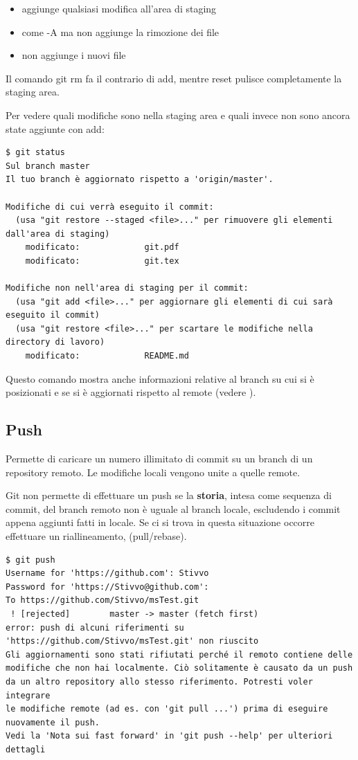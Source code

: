 \documentclass{article}
\begin{document}
\begin{itemize}
    \item {} aggiunge qualsiasi modifica all'area di staging
    \item {} come -A ma non aggiunge la rimozione dei file
    \item {} non aggiunge i nuovi file
\end{itemize}

Il comando git rm fa il contrario di add, mentre reset pulisce completamente la
staging area.

Per vedere quali modifiche sono nella staging area e quali invece non sono
ancora state aggiunte con add:

\begin{verbatim}
$ git status
Sul branch master
Il tuo branch è aggiornato rispetto a 'origin/master'.

Modifiche di cui verrà eseguito il commit:
  (usa "git restore --staged <file>..." per rimuovere gli elementi dall'area di staging)
	modificato:             git.pdf
	modificato:             git.tex

Modifiche non nell'area di staging per il commit:
  (usa "git add <file>..." per aggiornare gli elementi di cui sarà eseguito il commit)
  (usa "git restore <file>..." per scartare le modifiche nella directory di lavoro)
	modificato:             README.md
\end{verbatim}

Questo comando mostra anche informazioni relative al branch su cui si è
posizionati e se si è aggiornati rispetto al remote (vedere ).

\subsection{Push\label{push}}
Permette di caricare un numero illimitato di commit su un branch di un
repository remoto. Le modifiche locali vengono unite a quelle remote.

Git non permette di effettuare un push se la \textbf{storia}, intesa come sequenza di commit,
del branch remoto non è uguale al branch locale, escludendo i commit
appena aggiunti fatti in locale. Se ci si trova in questa situazione occorre effettuare un riallineamento,
(pull/rebase).

\begin{verbatim}
$ git push
Username for 'https://github.com': Stivvo
Password for 'https://Stivvo@github.com':
To https://github.com/Stivvo/msTest.git
 ! [rejected]        master -> master (fetch first)
error: push di alcuni riferimenti su 'https://github.com/Stivvo/msTest.git' non riuscito
Gli aggiornamenti sono stati rifiutati perché il remoto contiene delle
modifiche che non hai localmente. Ciò solitamente è causato da un push
da un altro repository allo stesso riferimento. Potresti voler integrare
le modifiche remote (ad es. con 'git pull ...') prima di eseguire
nuovamente il push.
Vedi la 'Nota sui fast forward' in 'git push --help' per ulteriori
dettagli
\end{verbatim}
\end{document}
